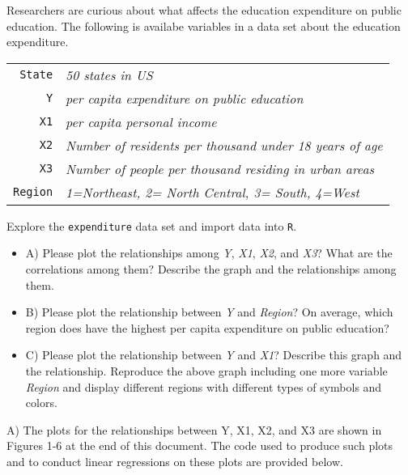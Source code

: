 \documentclass[12pt,letterpaper]{article}
\begin{document}
\noindent Researchers are curious about what affects the education expenditure on public education. The following is availabe variables in a data set about the education expenditure. \\
\vspace{.5cm}


\begin{tabular}{r|l}
	\texttt{State} &\emph{50 states in US} \\
	\texttt{Y} & \emph{per capita expenditure on public education}\\
	\texttt{X1} &\emph{per capita personal income} \\
	\texttt{X2} &  \emph{Number of residents per thousand under 18 years of age}\\
	\texttt{X3} &  \emph{Number of people per thousand residing in urban areas} \\
	\texttt{Region} &  \emph{1=Northeast, 2= North Central, 3= South, 4=West} \\
\end{tabular}

\vspace{.5cm}
\noindent Explore the \texttt{expenditure} data set and import data into \texttt{R}.
\vspace{.5cm}
  
\vspace{.5cm}
\begin{itemize}

\item
A) Please plot the relationships among \emph{Y}, \emph{X1}, \emph{X2}, and \emph{X3}? What are the correlations among them? Describe the graph and the relationships among them.
\vspace{.5cm}
\item 
B) Please plot the relationship between \emph{Y} and \emph{Region}? On average, which region does have the highest per capita expenditure on public education?
\vspace{.5cm}
\item
C) Please plot the relationship between \emph{Y} and \emph{X1}? Describe this graph and the relationship. Reproduce the above graph including one more variable \emph{Region} and display different regions with different types of symbols and colors.
\end{itemize}
\vspace{.5cm}
\noindent A) The plots for the relationships between Y, X1, X2, and X3 are shown in Figures 1-6 at the end of this document. The code used to produce such plots and to conduct linear regressions on these plots are provided below.
\vspace{.5cm}
  
\end{document}

